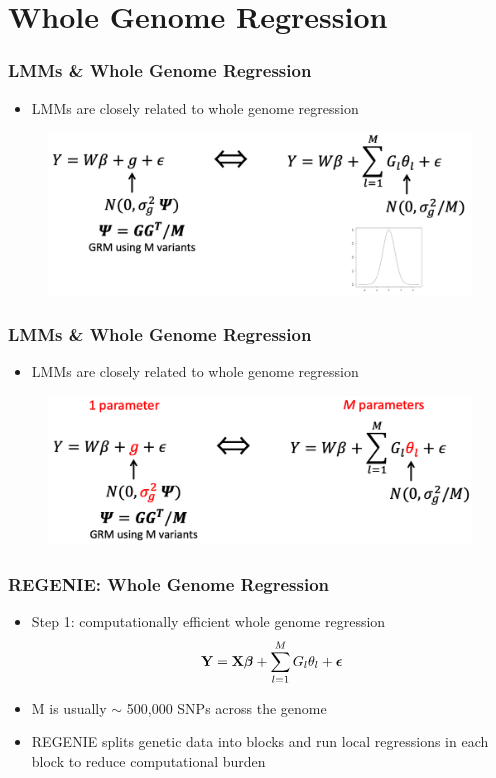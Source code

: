 \documentclass{beamer}
\newcommand{\bepsilon}{\mbox{\boldmath$\epsilon$}}
\begin{document}
\section{Whole Genome Regression}
\begin{frame}
	\frametitle{\bf  LMMs \&  Whole Genome Regression}
	\begin{itemize}
		\item LMMs are closely related to whole genome regression
	\end{itemize}
\vspace{-1em}
	\begin{figure}
	\includegraphics[scale=.4]{Figures/lmm_wgr}
\end{figure}
\end{frame}

\begin{frame}
	\frametitle{\bf  LMMs \&  Whole Genome Regression}
	\begin{itemize}
		\item LMMs are closely related to whole genome regression
	\end{itemize}
	\vspace{-1em}
	\begin{figure}
		\includegraphics[scale=.4]{Figures/lmm_wgr2}
	\end{figure}
\end{frame}


\begin{frame}
	\frametitle{\bf  REGENIE: Whole Genome Regression}
	\begin{itemize}
		\item Step 1: computationally efficient whole genome regression
		$$ \mathbf{Y}= \mathbf{X}\boldsymbol{\beta} +  \sum_{l=1}^MG_l\theta_l + \bepsilon  $$
		\item M is usually $\sim$ 500,000 SNPs across the genome
		\item REGENIE splits genetic data into blocks and run local regressions in each block to reduce computational burden
	\end{itemize}
\end{frame}
\end{document}
